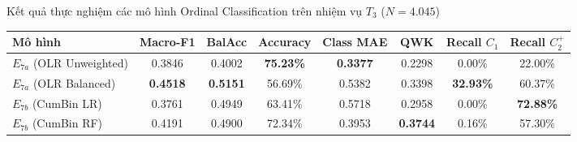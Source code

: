 \begin{table}{Kết quả thực nghiệm các mô hình Ordinal Classification trên nhiệm vụ $T_3$ ($N = 4.045$)}
\centering
\small
\setlength{\tabcolsep}{4.5pt}
\label{tab:ordinal-results}
\begin{tabular}{l c c c c c c c}
\toprule
\textbf{Mô hình} & \textbf{Macro-F1} & \textbf{BalAcc} & \textbf{Accuracy} & \textbf{Class MAE} & \textbf{QWK} & \textbf{Recall $C_1$} & \textbf{Recall $C_2^+$} \\
\midrule
$E_{7a}$ (OLR Unweighted) & 0.3846 & 0.4002 & \textbf{75.23\%} & \textbf{0.3377} & 0.2298 & 0.00\% & 22.00\% \\
$E_{7a}$ (OLR Balanced)   & \textbf{0.4518} & \textbf{0.5151} & 56.69\% & 0.5382 & 0.3398 & \textbf{32.93\%} & 60.37\% \\
$E_{7b}$ (CumBin LR)      & 0.3761 & 0.4949 & 63.41\% & 0.5718 & 0.2958 & 0.00\% & \textbf{72.88\%} \\
$E_{7b}$ (CumBin RF)      & 0.4191 & 0.4900 & 72.34\% & 0.3953 & \textbf{0.3744} & 0.16\% & 57.30\% \\
\bottomrule
\end{tabular}
\end{table}
